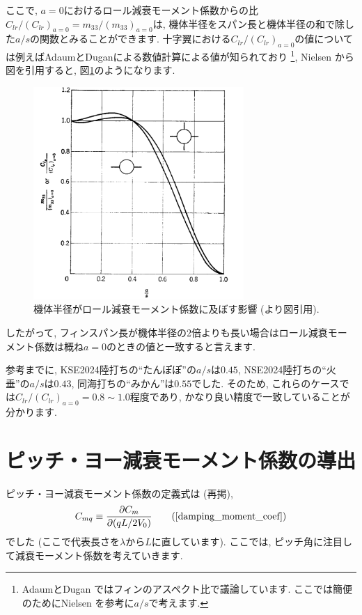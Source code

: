 \documentclass[uplatex,dvipdfmx,a4j,11  pt]{jsarticle}
\begin{document}
ここで, $a = 0$におけるロール減衰モーメント係数からの比$C_{lr}/(C_{lr})_{a = 0} = m_{33}/(m_{33})_{a = 0}$は, 機体半径をスパン長と機体半径の和で除した$a/s$の関数とみることができます.
十字翼における$C_{lr}/(C_{lr})_{a = 0}$の値については例えばAdaumとDuganによる数値計算による値が知られており\cite{roll_damping_moment_est}
\footnote{AdaumとDugan \cite{roll_damping_moment_est}ではフィンのアスペクト比で議論しています. ここでは簡便のためにNielsen \cite{nielsen1988missile}を参考に$a/s$で考えます.},
Nielsen \cite{nielsen1988missile} から図を引用すると, 図\ref{damping_vs_radius}のようになります.
\begin{figure}[htbp]
  \centering
  \includegraphics[width=80mm]{damping_moment/img/damping_coeff.png}
  \caption{機体半径がロール減衰モーメント係数に及ぼす影響 (\cite{nielsen1988missile}より図引用).}
  \label{damping_vs_radius}
\end{figure}

したがって, フィンスパン長が機体半径の2倍よりも長い場合はロール減衰モーメント係数は概ね$a = 0$のときの値と一致すると言えます.

参考までに, KSE2024陸打ちの``たんぽぽ''の$a/s$は$0.45$, NSE2024陸打ちの``火垂''の$a/s$は$0.43$, 同海打ちの``みかん''は$0.55$でした.
そのため, これらのケースでは$C_{lr}/(C_{lr})_{a = 0} = 0.8 \sim 1.0$程度であり, かなり良い精度で一致していることが分かります.


\section{ピッチ・ヨー減衰モーメント係数の導出}
ピッチ・ヨー減衰モーメント係数の定義式は (再掲),
\begin{equation}
  C_{mq} \equiv \frac{\partial C_m}{\partial (qL/2V_0)}\tag{\ref{damping_moment_coef}}
\end{equation}
でした (ここで代表長さを$\lambda$から$L$に直しています).
ここでは, ピッチ角に注目して減衰モーメント係数を考えていきます.
\end{document}
